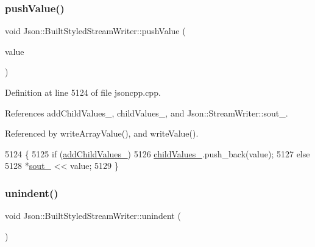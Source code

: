 \subsubsection{\texorpdfstring{push\+Value()}{pushValue()}}
{\footnotesize\ttfamily void Json\+::\+Built\+Styled\+Stream\+Writer\+::push\+Value (\begin{DoxyParamCaption}\item[{\hyperlink{json_8h_a1e723f95759de062585bc4a8fd3fa4be}{J\+S\+O\+N\+C\+P\+P\+\_\+\+S\+T\+R\+I\+NG} const \&}]{value }\end{DoxyParamCaption})\hspace{0.3cm}{\ttfamily [private]}}



Definition at line 5124 of file jsoncpp.\+cpp.



References add\+Child\+Values\+\_\+, child\+Values\+\_\+, and Json\+::\+Stream\+Writer\+::sout\+\_\+.



Referenced by write\+Array\+Value(), and write\+Value().


\begin{DoxyCode}
5124                                                                    \{
5125   \textcolor{keywordflow}{if} (\hyperlink{struct_json_1_1_built_styled_stream_writer_abed9cc31da503b48798e7cea68c42e16}{addChildValues\_})
5126     \hyperlink{struct_json_1_1_built_styled_stream_writer_a47d562d7874c5b1e68995bd62f575792}{childValues\_}.push\_back(value);
5127   \textcolor{keywordflow}{else}
5128     *\hyperlink{class_json_1_1_stream_writer_a4f5603d4228a9fa46a42cb44e5234d9b}{sout\_} << value;
5129 \}
\end{DoxyCode}
\mbox{\label{struct_json_1_1_built_styled_stream_writer_a0da6c6f603e00c8c6e38af553edd8c55}} 
\subsubsection{\texorpdfstring{unindent()}{unindent()}}
{\footnotesize\ttfamily void Json\+::\+Built\+Styled\+Stream\+Writer\+::unindent (\begin{DoxyParamCaption}{ }\end{DoxyParamCaption})\hspace{0.3cm}{\ttfamily [private]}}



